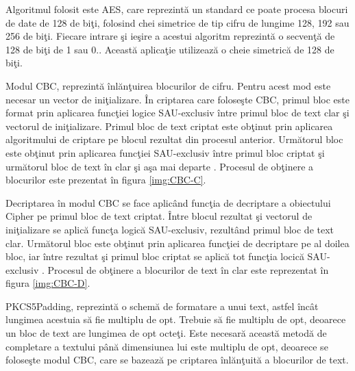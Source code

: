 Algoritmul folosit este AES, care reprezint\u{a} un standard ce poate procesa blocuri de date de 128 de bi\c{t}i, folosind chei simetrice de tip cifru de lungime 128, 192 sau 256 de bi\c{t}i. Fiecare intrare \c{s}i ie\c{s}ire a acestui algoritm reprezint\u{a} o secven\c{t}\u{a} de 128 de bi\c{t}i de 1 sau 0.\cite{Miller:2009:AES:1823209}. Aceast\u{a} aplica\c{t}ie utilizeaz\u{a} o cheie simetric\u{a} de 128 de bi\c{t}i. 

Modul CBC, reprezint\u{a} \^{i}nl\u{a}n\c{t}uirea blocurilor de cifru. Pentru acest mod este necesar un vector de ini\c{t}ializare. \^{I}n criptarea care folose\c{s}te CBC, primul bloc este format prin aplicarea func\c{t}iei logice SAU-exclusiv \^{i}ntre primul bloc de text clar \c{s}i vectorul de ini\c{t}ializare. Primul bloc de text criptat este ob\c{t}inut prin aplicarea algoritmului de criptare pe blocul rezultat din procesul anterior. Urm\u{a}torul bloc este ob\c{t}inut prin aplicarea func\c{t}iei SAU-exclusiv \^{i}ntre primul bloc criptat \c{s}i urm\u{a}torul bloc de text \^{i}n clar \c{s}i a\c{s}a mai departe \cite{Dworkin:2001:SER:2206247}. Procesul de ob\c{t}inere a blocurilor este prezentat \^{i}n figura \ref{img:CBC-C}.

\newpage
Decriptarea \^{i}n modul CBC se face aplic\^{a}nd func\c{t}ia de decriptare a obiectului Cipher pe primul bloc de text criptat. \^{I}ntre blocul rezultat \c{s}i vectorul de ini\c{t}ializare se aplic\u{a} func\c{t}a logic\u{a} SAU-exclusiv, rezult\^{a}nd primul bloc de text clar. Urm\u{a}torul bloc este ob\c{t}inut prin aplicarea func\c{t}iei de decriptare pe al doilea bloc, iar \^{i}ntre rezultat \c{s}i primul bloc criptat se aplic\u{a} tot func\c{t}ia locic\u{a} SAU-exclusiv \cite{Dworkin:2001:SER:2206247}. Procesul de ob\c{t}inere a blocurilor de text \^{i}n clar este reprezentat \^{i}n figura \ref{img:CBC-D}.
  

PKCS5Padding, reprezint\u{a} o schem\u{a} de formatare a unui text, astfel \^{i}nc\^{a}t lungimea acestuia s\u{a} fie multiplu de opt. Trebuie s\u{a} fie multiplu de opt, deoarece un bloc de text are lungimea de opt octe\c{t}i. Este necesar\u{a} aceast\u{a} metod\u{a} de completare a textului p\^{a}n\u{a} dimensiunea lui este multiplu de opt, deoarece se folose\c{s}te modul CBC, care se bazeaz\u{a} pe criptarea \^{i}nl\u{a}n\c{t}uit\u{a} a blocurilor de text.

